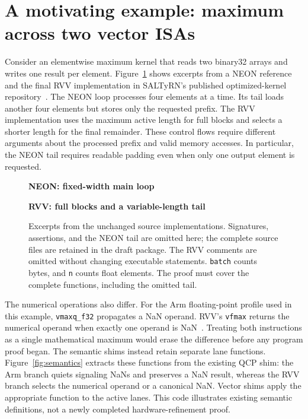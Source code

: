 \section{A motivating example: maximum across two vector ISAs}
\label{sec:example}


Consider an elementwise maximum kernel that reads two binary32 arrays and writes one result per element. Figure~\ref{fig:kernels} shows excerpts from a NEON reference and the final RVV implementation in SALTyRN's published optimized-kernel repository~\cite{final-kernels}. The NEON loop processes four elements at a time. Its tail loads another four elements but stores only the requested prefix. The RVV implementation uses the maximum active length for full blocks and selects a shorter length for the final remainder. These control flows require different arguments about the processed prefix and valid memory accesses. In particular, the NEON tail requires readable padding even when only one output element is requested.

\begin{figure}[t]
\begin{minipage}{\linewidth}
\textbf{NEON: fixed-width main loop}

\medskip
\textbf{RVV: full blocks and a variable-length tail}

\end{minipage}
\caption{Excerpts from the unchanged source implementations. Signatures, assertions, and the NEON tail are omitted here; the complete source files are retained in the draft package. The RVV comments are omitted without changing executable statements. \texttt{batch} counts bytes, and \texttt{n} counts float elements. The proof must cover the complete functions, including the omitted tail.}
\label{fig:kernels}
\end{figure}

The numerical operations also differ. For the Arm floating-point profile used in this example, \texttt{vmaxq\_f32} propagates a NaN operand. RVV's \texttt{vfmax} returns the numerical operand when exactly one operand is NaN~\cite{acle,rvv}. Treating both instructions as a single mathematical maximum would erase the difference before any program proof began. The semantic shims instead retain separate lane functions. Figure~\ref{fig:semantics} extracts these functions from the existing QCP shim: the Arm branch quiets signaling NaNs and preserves a NaN result, whereas the RVV branch selects the numerical operand or a canonical NaN. Vector shims apply the appropriate function to the active lanes. This code illustrates existing semantic definitions, not a newly completed hardware-refinement proof.

